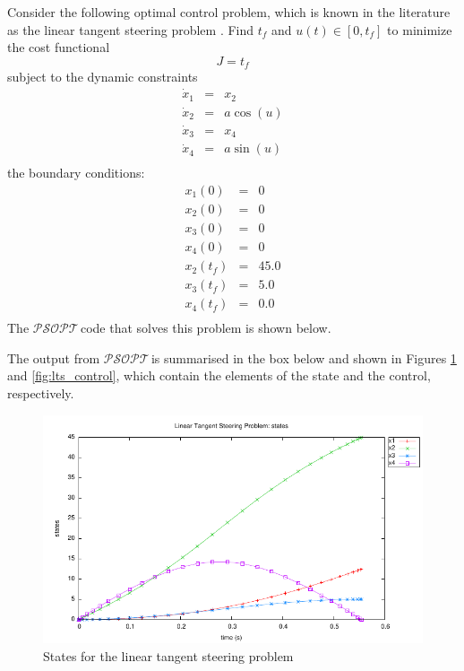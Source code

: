 \documentclass[a4paper,11pt]{report}    %
\newcommand{\psopt}{$\mathcal{PSOPT}$\,}  %
\newenvironment{shadedframe}{%
  \def\FrameCommand{\fcolorbox{black}{shadecolor}}%
  \MakeFramed {\FrameRestore}}
{\endMakeFramed}
\begin{document}
Consider the following optimal control problem, which is known in the literature
as the linear tangent steering problem \cite{Betts:01}.  Find $t_f$ and $u(t) \in [0, t_f]$ 
to minimize the cost functional
\begin{equation}
  J = t_f
\end{equation}
subject to the dynamic constraints
\begin{equation}
  \begin{array}{lcl}
   \dot x_1 &=& x_2 \\
   \dot x_2 &=& a \cos(u) \\
   \dot x_3 &=& x_4 \\
   \dot x_4 &=& a \sin(u)\\
  \end{array}
\end{equation}
the boundary conditions:
 \begin{equation}
  \begin{array}{lcl}
   x_1(0) &=& 0 \\
   x_2(0) &=& 0 \\
   x_3(0) &=& 0 \\
   x_4(0) &=& 0  \\
   x_2(t_f) &=& 45.0 \\
   x_3(t_f) &=& 5.0 \\
   x_4(t_f) &=& 0.0 \\
  \end{array}
\end{equation}
The \psopt code that solves this problem is shown below.  

\tiny
\begin{shadedframe}

\end{shadedframe}
\normalsize

The output from \psopt is summarised in the box below and shown in Figures \ref{fig:lts_states} and \ref{fig:lts_control}, which contain the elements
of the state and the control, respectively.

\begin{shadedframe}

\end{shadedframe}

\begin{figure}
  \centering 
  \includegraphics{../examples/lts/lts_states}
  \caption{States for the linear tangent steering problem}
 \label{fig:lts_states}
\end{figure}
\end{document}
